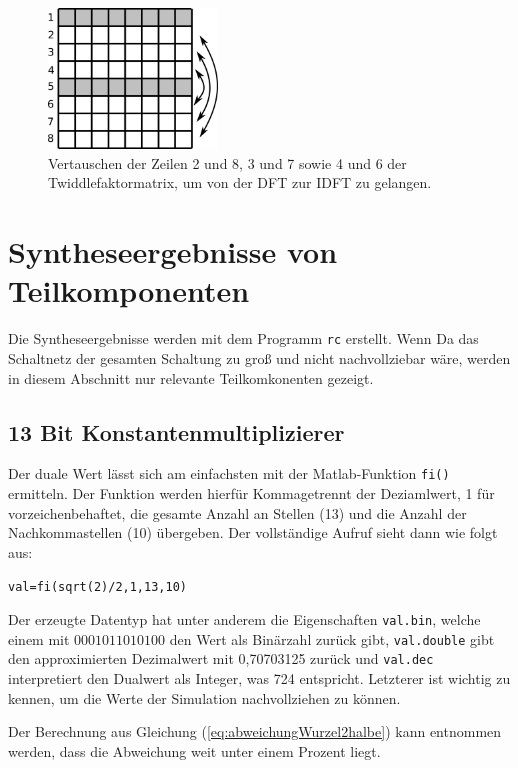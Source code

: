 \begin{figure}[ht]
 \centering
 \includegraphics[width=0.4\textwidth]{img/IDFT_Zeilentausch.png}
 \caption{Vertauschen der Zeilen 2 und 8, 3 und 7 sowie 4 und 6 der Twiddlefaktormatrix, um von der DFT zur IDFT zu gelangen.}
 \label{pic:IDFT_Zeilentausch}
\end{figure}




\section{Syntheseergebnisse von Teilkomponenten}\label{sec:Syntheseergebnisse}
Die Syntheseergebnisse werden mit dem Programm \texttt{rc} erstellt. Wenn 
Da das Schaltnetz der gesamten Schaltung zu groß und nicht nachvollziebar wäre, werden in diesem Abschnitt nur relevante Teilkomkonenten gezeigt.

\subsection{13 Bit Konstantenmultiplizierer}\label{sec:Konstantenmultiplizierer}

Der duale Wert lässt sich am einfachsten mit der Matlab-Funktion \texttt{fi()} ermitteln. Der Funktion werden hierfür Kommagetrennt der Deziamlwert, 1 für vorzeichenbehaftet,
die gesamte Anzahl an Stellen (13) und die Anzahl der Nachkommastellen (10) übergeben. Der vollständige Aufruf sieht dann wie folgt aus:

\texttt{val=fi(sqrt(2)/2,1,13,10)}

Der erzeugte Datentyp hat unter anderem die Eigenschaften \texttt{val.bin}, welche einem mit $0001011010100$ den Wert als Binärzahl zurück gibt, 
\texttt{val.double} gibt den approximierten Dezimalwert mit 0,70703125 zurück und \texttt{val.dec} interpretiert den Dualwert als Integer, was 724 entspricht.
Letzterer ist wichtig zu kennen, um die Werte der Simulation nachvollziehen zu können.

Der Berechnung aus Gleichung (\ref{eq:abweichungWurzel2halbe}) kann entnommen werden, dass die Abweichung weit unter einem Prozent liegt.

